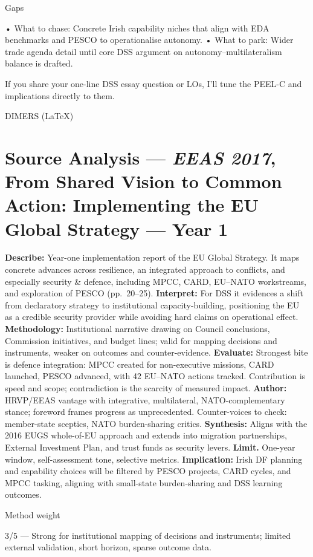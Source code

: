 Gaps

• What to chase: Concrete Irish capability niches that align with EDA benchmarks and PESCO to operationalise autonomy.
• What to park: Wider trade agenda detail until core DSS argument on autonomy–multilateralism balance is drafted.

If you share your one-line DSS essay question or LOs, I’ll tune the PEEL-C and implications directly to them.

\parencite{EU_2017}

DIMERS (LaTeX)

\section*{Source Analysis — \textit{EEAS 2017}, From Shared Vision to Common Action: Implementing the EU Global Strategy — Year 1}
\textbf{Describe:} Year-one implementation report of the EU Global Strategy. It maps concrete advances across resilience, an integrated approach to conflicts, and especially security \& defence, including MPCC, CARD, EU–NATO workstreams, and exploration of PESCO (pp.\ 20–25).
\textbf{Interpret:} For DSS it evidences a shift from declaratory strategy to institutional capacity-building, positioning the EU as a credible security provider while avoiding hard claims on operational effect.
\textbf{Methodology:} Institutional narrative drawing on Council conclusions, Commission initiatives, and budget lines; valid for mapping decisions and instruments, weaker on outcomes and counter-evidence.
\textbf{Evaluate:} Strongest bite is defence integration: MPCC created for non-executive missions, CARD launched, PESCO advanced, with 42 EU–NATO actions tracked. Contribution is speed and scope; contradiction is the scarcity of measured impact.
\textbf{Author:} HRVP/EEAS vantage with integrative, multilateral, NATO-complementary stance; foreword frames progress as unprecedented. Counter-voices to check: member-state sceptics, NATO burden-sharing critics.
\textbf{Synthesis:} Aligns with the 2016 EUGS whole-of-EU approach and extends into migration partnerships, External Investment Plan, and trust funds as security levers.
\textbf{Limit.} One-year window, self-assessment tone, selective metrics. \textbf{Implication:} Irish DF planning and capability choices will be filtered by PESCO projects, CARD cycles, and MPCC tasking, aligning with small-state burden-sharing and DSS learning outcomes.

Method weight

3/5 — Strong for institutional mapping of decisions and instruments; limited external validation, short horizon, sparse outcome data.

